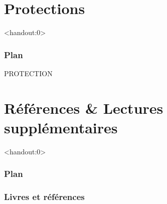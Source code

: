 \section{Protections}

\begin{frame}<handout:0>
  \frametitle{Plan}
  \tableofcontents[currentsection]
\end{frame}

\begin{frame}

PROTECTION

\end{frame}

\section{Références \& Lectures supplémentaires}

\begin{frame}<handout:0>
  \frametitle{Plan}
  \tableofcontents[currentsection,subsectionstyle=hide]
\end{frame}

\nocite{*}


\begin{frame}[allowframebreaks]
  \frametitle{Livres et références}
  
\end{frame}

\begin{frame}
  \vfill
  \centering
  \vfill
\end{frame}
